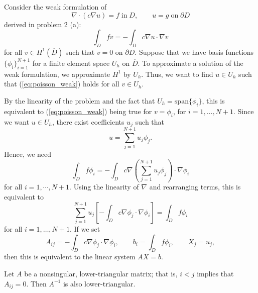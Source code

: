 \documentclass{homework}
\begin{document}
	\question 
	Consider the weak formulation of
	\begin{equation}
		\nabla\cdot(c\nabla u) = f \;\text{in}\; D,\qquad u = g \;\text{on}\;\partial D
	\end{equation}
	derived in problem 2 (a):
	\begin{equation}
		\label{eq:poisson_weak}
		\int_D fv = -\int_D c\nabla u\cdot \nabla v
	\end{equation}
	for all $v \in H^1\left(\overline{D}\right)$ such that $v = 0$ on $\partial D$. Suppose that we have basis functions $\{\phi_i\}_{i=1}^{N+1}$ for a finite element space $U_h$ on $\overline{D}$. To approximate a solution of the weak formulation, we approximate $H^1$ by $U_h$. Thus, we want to find $u \in U_h$ such that (\ref{eq:poisson_weak}) holds for all $v \in U_h$.
	
	By the linearity of the problem and the fact that $U_h = \mathrm{span}\{\phi_i\}$, this is equivalent to (\ref{eq:poisson_weak}) being true for $v = \phi_i$, for $i = 1, \dots, N+1$. Since we want $u \in U_h$, there exist coefficients $u_j$ such that
	\begin{equation}
		u = \sum_{j=1}^{N+1}u_j\phi_j.
	\end{equation}
	Hence, we need
	\begin{equation}
		\int_D f\phi_i = -\int_D c\nabla \left(\sum_{j=1}^{N+1}u_j\phi_j\right)\cdot \nabla \phi_i
	\end{equation}
	for all $i = 1,\cdots,N+1$. Using the linearity of $\nabla$ and rearranging terms, this is equivalent to
	\begin{equation}
		\sum_{j=1}^{N+1}u_j\left[-\int_Dc\nabla \phi_j\cdot\nabla \phi_i\right] = \int_D f\phi_i
	\end{equation}
	for all $i =1, \dots, N+1$. If we set
	\begin{equation}
		A_{ij} = -\int_Dc\nabla\phi_j\cdot\nabla\phi_i,\qquad b_i = \int_D f\phi_i, \qquad X_j = u_j,
	\end{equation}
	then this is equivalent to the linear system $AX = b$.
	
	\question
	Let $A$ be a nonsingular, lower-triangular matrix; that is, $i < j$ implies that $A_{ij} = 0$. Then $A^{-1}$ is also lower-triangular.
	
\end{document}
